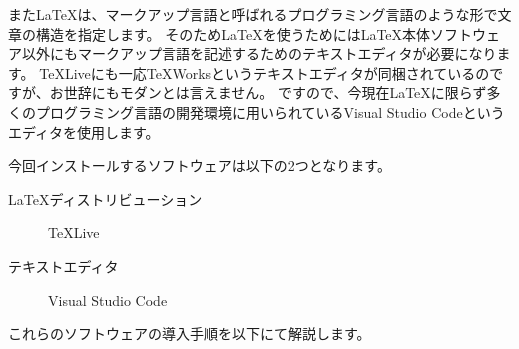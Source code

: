 \documentclass[uplatex,b5j]{jsbook}
\begin{document}
		また\LaTeX は、マークアップ言語と呼ばれるプログラミング言語のような形で文章の構造を指定します。
		そのため\LaTeX を使うためには\LaTeX 本体ソフトウェア以外にもマークアップ言語を記述するためのテキストエディタが必要になります。
		\TeX Liveにも一応\TeX Worksというテキストエディタが同梱されているのですが、お世辞にもモダンとは言えません。
		ですので、今現在\LaTeX に限らず多くのプログラミング言語の開発環境に用いられているVisual Studio Codeというエディタを使用します。

		今回インストールするソフトウェアは以下の2つとなります。
		\begin{description}
			\item[\LaTeX ディストリビューション] \TeX Live
			\item[テキストエディタ] Visual Studio Code 
		\end{description}
		これらのソフトウェアの導入手順を以下にて解説します。
\end{document}
